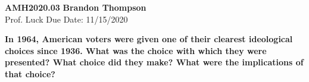 \noindent
\textbf{AMH2020.03} \hfill \textbf{Brandon Thompson} \\
\normalsize Prof. Luck \hfill Due Date: 11/15/2020 \\

\begin{center}
\textbf{In 1964, American voters were given one of their clearest ideological choices since 1936. What was the choice with which they were presented? What choice did they make? What were the implications of that choice?}
\end{center}